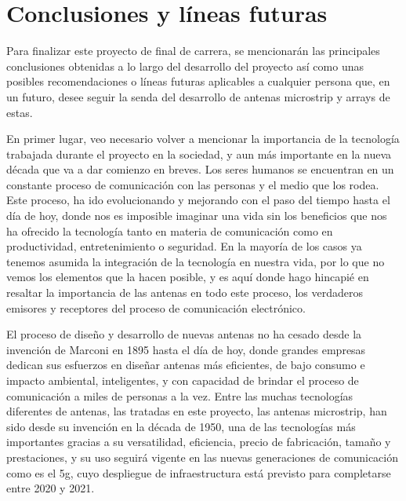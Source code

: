 

\chapter{Conclusiones y líneas futuras}
\label{conclusiones}

\par Para finalizar este proyecto de final de carrera, se mencionarán las principales conclusiones obtenidas a lo largo del desarrollo del proyecto así como unas posibles recomendaciones o líneas futuras aplicables a cualquier persona que, en un futuro, desee seguir la senda del desarrollo de antenas microstrip y arrays de estas.
\\
\par En primer lugar, veo necesario volver a mencionar la importancia de la tecnología trabajada durante el proyecto en la sociedad, y aun más importante en la nueva década que va a dar comienzo en breves. Los seres humanos se encuentran en un constante proceso de comunicación con las personas y el medio que los rodea. Este proceso, ha ido evolucionando y mejorando con el paso del tiempo hasta el día de hoy, donde nos es imposible imaginar una vida sin los beneficios que nos ha ofrecido la tecnología tanto en materia de comunicación como en productividad, entretenimiento o seguridad. En la mayoría de los casos ya tenemos asumida la integración de la tecnología en nuestra vida, por lo que no vemos los elementos que la hacen posible, y es aquí donde hago hincapié en resaltar la importancia de las antenas en todo este proceso, los verdaderos emisores y receptores del proceso de comunicación electrónico. 
\\
\par El proceso de diseño y desarrollo de nuevas antenas no ha cesado desde la invención de Marconi en 1895 hasta el día de hoy, donde grandes empresas dedican sus esfuerzos en diseñar antenas más eficientes, de bajo consumo e impacto ambiental, inteligentes, y con capacidad de brindar el proceso de comunicación a miles de personas a la vez. Entre las muchas tecnologías diferentes de antenas, las tratadas en este proyecto, las antenas microstrip, han sido desde su invención en la década de 1950, una de las tecnologías más importantes gracias a su versatilidad, eficiencia, precio de fabricación, tamaño y prestaciones, y su uso seguirá vigente en las nuevas generaciones de comunicación como es el \gls{5g}, cuyo despliegue de infraestructura está previsto para completarse entre 2020 y 2021. 
